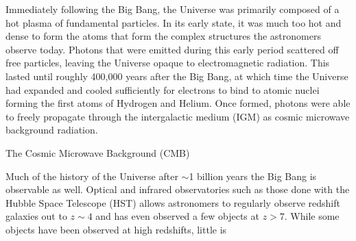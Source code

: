Immediately following the Big Bang, the Universe was primarily composed of a hot plasma of fundamental particles. In its early state, it was much too hot and dense to form the atoms that form the complex structures the astronomers observe today. Photons that were emitted during this early period scattered off free particles, leaving the Universe opaque to electromagnetic radiation. This lasted until roughly 400,000 years after the Big Bang, at which time the Universe had expanded and cooled sufficiently for electrons to bind to atomic nuclei forming the first atoms of Hydrogen and Helium. Once formed, photons were able to freely propagate through the intergalactic medium (IGM) as cosmic microwave background radiation.

The Cosmic Microwave Background (CMB)

Much of the history of the Universe after $\sim$1 billion years the Big Bang is observable as well. Optical and infrared observatories such as those done with the Hubble Space Telescope (HST) allows astronomers to regularly observe redshift galaxies out to $z \sim 4$ and has even observed a few objects at $z > 7$. While some objects have been observed at high redshifts, little is 
